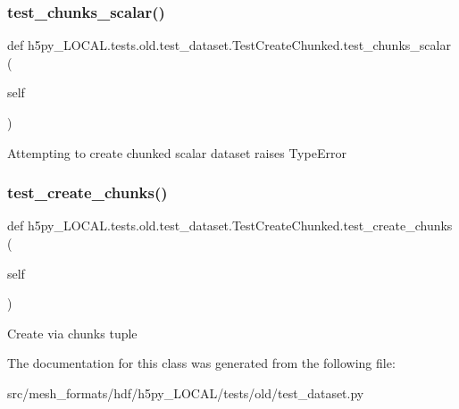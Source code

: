 \subsubsection{\texorpdfstring{test\+\_\+chunks\+\_\+scalar()}{test\_chunks\_scalar()}}
{\footnotesize\ttfamily def h5py\+\_\+\+L\+O\+C\+A\+L.\+tests.\+old.\+test\+\_\+dataset.\+Test\+Create\+Chunked.\+test\+\_\+chunks\+\_\+scalar (\begin{DoxyParamCaption}\item[{}]{self }\end{DoxyParamCaption})}

\begin{DoxyVerb}Attempting to create chunked scalar dataset raises TypeError \end{DoxyVerb}
 \mbox{\label{classh5py__LOCAL_1_1tests_1_1old_1_1test__dataset_1_1TestCreateChunked_ae22519e7713518892334a1d61f9aa5f5}} 
\subsubsection{\texorpdfstring{test\+\_\+create\+\_\+chunks()}{test\_create\_chunks()}}
{\footnotesize\ttfamily def h5py\+\_\+\+L\+O\+C\+A\+L.\+tests.\+old.\+test\+\_\+dataset.\+Test\+Create\+Chunked.\+test\+\_\+create\+\_\+chunks (\begin{DoxyParamCaption}\item[{}]{self }\end{DoxyParamCaption})}

\begin{DoxyVerb}Create via chunks tuple \end{DoxyVerb}
 

The documentation for this class was generated from the following file\+:\begin{DoxyCompactItemize}
\item 
src/mesh\+\_\+formats/hdf/h5py\+\_\+\+L\+O\+C\+A\+L/tests/old/test\+\_\+dataset.\+py\end{DoxyCompactItemize}
